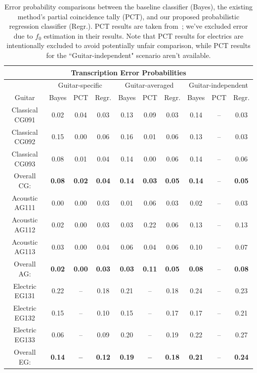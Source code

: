 \documentclass[12pt]{cmuthesis}
\begin{document}
\begin{table}[!htbp]
\begin{center}
\begin{tabular} {||c||c|c|c||c|c|c||c|c|c||}
\hline
\multicolumn{10}{||c||}{\bf{Transcription Error Probabilities}} \\
\hline
 & \multicolumn{3}{|c||}{Guitar-specific} & \multicolumn{3}{|c||}{Guitar-averaged}& \multicolumn{3}{|c||}{Guitar-independent}\\
\hline
Guitar & Bayes & PCT & Regr. & Bayes & PCT & Regr. & Bayes & PCT & Regr.\\
\hline
\hline
Classical CG091 & 0.02 & 0.04 & 0.03 & 0.13 & 0.09 & 0.03 & 0.14 & -- & 0.03 \\
\hline
Classical CG092 & 0.15 & 0.00 & 0.06 & 0.16 & 0.01 & 0.06 & 0.13 & -- & 0.03 \\
\hline
Classical CG093 & 0.08 & 0.01 & 0.04 & 0.14 & 0.00 & 0.06 & 0.14 & -- & 0.06 \\
\hline
Overall CG: & \bf{0.08} & \bf{0.02}  & \bf{0.04} & \bf{0.14} & \bf{0.03} & \bf{0.05} & \bf{0.14} & -- & \bf{0.05}\\
\hline
\hline
Acoustic AG111 & 0.00 & 0.00 & 0.03 & 0.01 & 0.06 & 0.03 & 0.02 & -- & 0.03 \\
\hline
Acoustic AG112 & 0.02 & 0.00 & 0.03 & 0.03 & 0.22 & 0.06 & 0.13 & -- & 0.13 \\
\hline
Acoustic AG113  & 0.03 & 0.00 & 0.04 & 0.06 & 0.04 & 0.06 & 0.10 & -- & 0.07\\
\hline
Overall AG: & \bf{0.02} & \bf{0.00} & \bf{0.03} & \bf{0.03} & \bf{0.11} & \bf{0.05} & \bf{0.08} & -- & \bf{0.08}\\
\hline
\hline
Electric EG131 & 0.22 & -- & 0.18 & 0.21 & -- & 0.18 & 0.24 & -- & 0.23\\
\hline
Electric EG132 & 0.15 & -- & 0.10 & 0.15 & -- & 0.17 & 0.17 & -- & 0.21\\
\hline
Electric EG133 & 0.06 & -- & 0.09 & 0.20 & --  & 0.19 & 0.22 & -- & 0.27 \\
\hline
Overall EG: & \bf{0.14} & \bf{--} & \bf{0.12} & \bf{0.19} & \bf{--} & \bf{0.18} & \bf{0.21} & -- & \bf{0.24}\\
\hline
\hline
\hline
\end{tabular}
\caption{Error probability comparisons between the baseline classifier (Bayes), the existing method's partial coincidence tally (PCT), and our proposed probabilistic regression classifier (Regr.). PCT results are taken from~\cite{barbanchoi2012}; we've excluded error due to $f_0$ estimation in their results. Note that PCT results for electrics are intentionally excluded to avoid potentially unfair comparison, while PCT results for the ``Guitar-independent" scenario aren't available.}
\label{tab:error-results-RWC}
\end{center}
\end{table}
\end{document}
